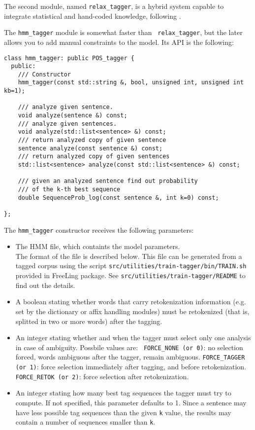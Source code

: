 \documentclass[a4paper]{book}
\begin{document}
  The second module, named {\tt relax\_tagger}, is a hybrid system
  capable to integrate statistical and hand-coded knowledge, following
  \cite{padro98a}.

  The {\tt hmm\_tagger} module is somewhat faster than {\tt
    relax\_tagger}, but the later allows you to add manual constraints
  to the model. Its API is the following:
\begin{verbatim}
class hmm_tagger: public POS_tagger {
  public:
    /// Constructor
    hmm_tagger(const std::string &, bool, unsigned int, unsigned int kb=1);

    /// analyze given sentence.
    void analyze(sentence &) const;
    /// analyze given sentences.
    void analyze(std::list<sentence> &) const;
    /// return analyzed copy of given sentence
    sentence analyze(const sentence &) const;
    /// return analyzed copy of given sentences
    std::list<sentence> analyze(const std::list<sentence> &) const;

    /// given an analyzed sentence find out probability 
    /// of the k-th best sequence
    double SequenceProb_log(const sentence &, int k=0) const;

};
\end{verbatim}

  The {\tt hmm\_tagger} constructor receives the following parameters:
\begin{itemize}
\item The HMM file, which containts the model parameters. \\
  The format
  of the file is described below. This file can be generated from a
  tagged corpus using the script  {\tt src/utilities/train-tagger/bin/TRAIN.sh}
   provided in FreeLing package. See  {\tt src/utilities/train-tagger/README}
  to find out the details.
\item A boolean stating whether words that carry retokenization
  information (e.g. set by the dictionary or affix handling modules)
  must be retokenized (that is, splitted in two or more words) after
  the tagging.
\item An integer stating whether and when the tagger must select only
  one analysis in case of ambiguity. Possbile values are: {\tt
    FORCE\_NONE (or 0)}: no selection forced, words ambiguous after
  the tagger, remain ambiguous.  {\tt FORCE\_TAGGER (or 1)}: force
  selection immediately after tagging, and before retokenization. {\tt
    FORCE\_RETOK (or 2)}: force selection after retokenization.
\item An integer stating how many best tag sequences the tagger must
  try to compute. If not specified, this parameter defaults to 1.
  Since a sentence may have less possible tag sequences than the given
  {\tt k} value, the results may contain a number of sequences smaller
  than {\tt k}.
\end{itemize}
\end{document}
